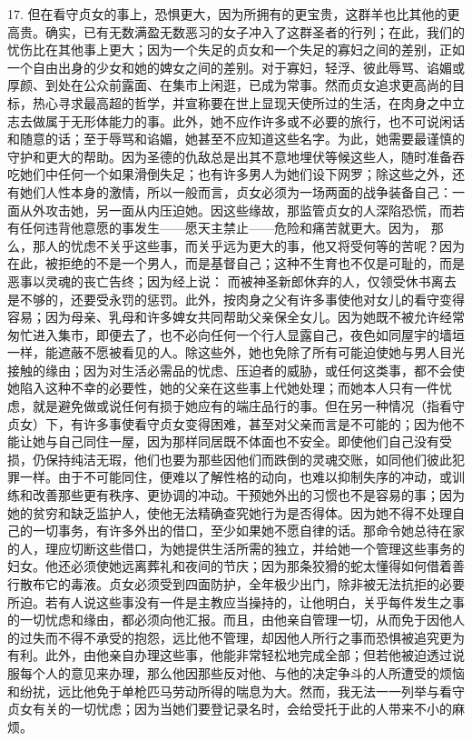 17. 但在看守贞女的事上，恐惧更大，因为所拥有的更宝贵，这群羊也比其他的更高贵。确实，已有无数满盈无数恶习的女子冲入了这群圣者的行列；在此，我们的忧伤比在其他事上更大；因为一个失足的贞女和一个失足的寡妇之间的差别，正如一个自由出身的少女和她的婢女之间的差别。对于寡妇，轻浮、彼此辱骂、谄媚或厚颜、到处在公众前露面、在集市上闲逛，已成为常事。然而贞女追求更高尚的目标，热心寻求最高超的哲学，并宣称要在世上显现天使所过的生活，在肉身之中立志去做属于无形体能力的事。此外，她不应作许多或不必要的旅行，也不可说闲话和随意的话；至于辱骂和谄媚，她甚至不应知道这些名字。为此，她需要最谨慎的守护和更大的帮助。因为圣德的仇敌总是出其不意地埋伏等候这些人，随时准备吞吃她们中任何一个如果滑倒失足；也有许多男人为她们设下网罗；除这些之外，还有她们人性本身的激情，所以一般而言，贞女必须为一场两面的战争装备自己：一面从外攻击她，另一面从内压迫她。因这些缘故，那监管贞女的人深陷恐慌，而若有任何违背他意愿的事发生——愿天主禁止——危险和痛苦就更大。因为， 那么，那人的忧虑不关乎这些事，而关乎远为更大的事，他又将受何等的苦呢？因为在此，被拒绝的不是一个男人，而是基督自己；这种不生育也不仅是可耻的，而是恶事以灵魂的丧亡告终；因为经上说： 而被神圣新郎休弃的人，仅领受休书离去是不够的，还要受永罚的惩罚。此外，按肉身之父有许多事使他对女儿的看守变得容易；因为母亲、乳母和许多婢女共同帮助父亲保全女儿。因为她既不被允许经常匆忙进入集市，即便去了，也不必向任何一个行人显露自己，夜色如同屋宇的墙垣一样，能遮蔽不愿被看见的人。除这些外，她也免除了所有可能迫使她与男人目光接触的缘由；因为对生活必需品的忧虑、压迫者的威胁，或任何这类事，都不会使她陷入这种不幸的必要性，她的父亲在这些事上代她处理；而她本人只有一件忧虑，就是避免做或说任何有损于她应有的端庄品行的事。但在另一种情况（指看守贞女）下，有许多事使看守贞女变得困难，甚至对父亲而言是不可能的；因为他不能让她与自己同住一屋，因为那样同居既不体面也不安全。即使他们自己没有受损，仍保持纯洁无瑕，他们也要为那些因他们而跌倒的灵魂交账，如同他们彼此犯罪一样。由于不可能同住，便难以了解性格的动向，也难以抑制失序的冲动，或训练和改善那些更有秩序、更协调的冲动。干预她外出的习惯也不是容易的事；因为她的贫穷和缺乏监护人，使他无法精确查究她行为是否得体。因为她不得不处理自己的一切事务，有许多外出的借口，至少如果她不愿自律的话。那命令她总待在家的人，理应切断这些借口，为她提供生活所需的独立，并给她一个管理这些事务的妇女。他还必须使她远离葬礼和夜间的节庆；因为那条狡猾的蛇太懂得如何借着善行散布它的毒液。贞女必须受到四面防护，全年极少出门，除非被无法抗拒的必要所迫。若有人说这些事没有一件是主教应当操持的，让他明白，关乎每件发生之事的一切忧虑和缘由，都必须向他汇报。而且，由他亲自管理一切，从而免于因他人的过失而不得不承受的抱怨，远比他不管理，却因他人所行之事而恐惧被追究更为有利。此外，由他亲自办理这些事，他能非常轻松地完成全部；但若他被迫透过说服每个人的意见来办理，那么他因那些反对他、与他的决定争斗的人所遭受的烦恼和纷扰，远比他免于单枪匹马劳动所得的喘息为大。然而，我无法一一列举与看守贞女有关的一切忧虑；因为当她们要登记录名时，会给受托于此的人带来不小的麻烦。\par

